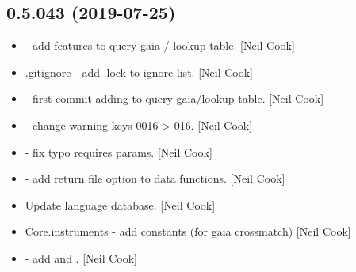 \documentclass[a4paper,10pt,english]{report}
\begin{document}
\subsection{0.5.043 (2019-07-25)}
\label{\detokenize{misc/changelog:id98}}\begin{itemize}
\item {} 
 - add features to query gaia / lookup table.
{[}Neil Cook{]}

\item {} 
.gitignore - add .lock to ignore list. {[}Neil Cook{]}

\item {} 
 - first commit \textendash{} adding to query
gaia/lookup table. {[}Neil Cook{]}

\item {} 
 - change warning keys 0016 \textendash{}\textgreater{} 016.
{[}Neil Cook{]}

\item {} 
 - fix typo  requires params. {[}Neil
Cook{]}

\item {} 
 - add return file option to data functions. {[}Neil Cook{]}

\item {} 
Update language database. {[}Neil Cook{]}

\item {} 
Core.instruments - add  constants (for gaia crossmatch) {[}Neil
Cook{]}

\item {} 
 - add  and . {[}Neil Cook{]}

\end{itemize}
\end{document}
